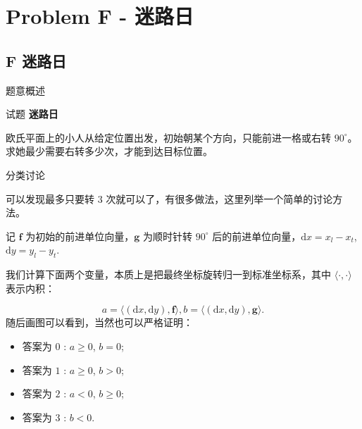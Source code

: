 \documentclass{beamer}
\newcommand{\TT}[1] {{\ttfamily #1}}
\newcommand{\BF}[1] {\textbf{#1}}
\begin{document}
{

\section[F]{Problem F - 迷路日}
\subsection{F 迷路日}




\begin{frame}{题意概述}

\begin{center}
试题 \myboxvi{      \BF{\TT{F}}} \BF{迷路日}
\end{center}

欧氏平面上的小人从给定位置出发，初始朝某个方向，只能前进一格或右转 $90^\circ$。
求她最少需要右转多少次，才能到达目标位置。

\end{frame}


\begin{frame}{分类讨论}

可以发现最多只要转 $3$ 次就可以了，有很多做法，这里列举一个简单的讨论方法。

记 $\boldsymbol{f}$ 为初始的前进单位向量，$\boldsymbol{g}$ 为顺时针转 $90^\circ$ 后的前进单位向量，$\mathrm{d}x = x_l - x_t$, $\mathrm{d}y = y_l - y_t$.

我们计算下面两个变量，本质上是把最终坐标旋转归一到标准坐标系，其中 $\langle \cdot, \cdot \rangle$ 表示内积：

\[
  a = \langle (\mathrm{d}x, \mathrm{d}y), \boldsymbol{f} \rangle, b = \langle (\mathrm{d}x, \mathrm{d}y), \boldsymbol{g} \rangle.
\]
随后画图可以看到，当然也可以严格证明：

\begin{itemize}
  \item 答案为 $0$ : $a \ge 0$, $b = 0$;
  \item 答案为 $1$ : $a \ge 0$, $b > 0$;
  \item 答案为 $2$ : $a < 0$, $b \ge 0$;
  \item 答案为 $3$ : $b < 0$.
\end{itemize}


\end{frame}

}
\end{document}
